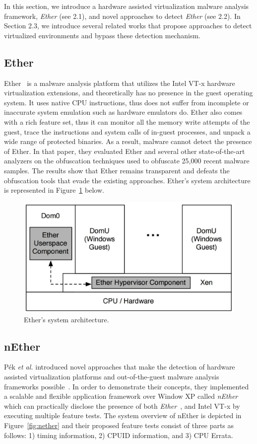 In this section, we introduce a hardware assisted virtualization malware analysis framework, \textit{Ether} (see 2.1), and novel approaches to detect \textit{Ether} (see 2.2). In Section 2.3, we introduce several related works that propose approaches to detect virtualized environments and bypass these detection mechanism.

\subsection{Ether}
Ether~\cite{ether} is a malware analysis platform that utilizes the Intel VT-x
hardware virtualization extensions, and theoretically has no presence in the
guest operating system. It uses native CPU instructions, thus does not suffer
from incomplete or inaccurate system emulation such as hardware emulators do.
Ether also comes with a rich feature set, thus it can monitor all the memory
write attempts of the guest, trace the instructions and system calls of in-guest
processes, and unpack a wide range of protected binaries. As a result, malware
cannot detect the presence of Ether. In that paper, they evaluated Ether and
several other state-of-the-art analyzers on the obfuscation techniques used to
obfuscate 25,000 recent malware samples. The results show that Ether remains
transparent and defeats the obfuscation tools that evade the existing
approaches. Ether's system architecture is represented in Figure~\ref{fig:ether}
below.

\begin{figure}[!h]
	\centering
	\includegraphics[width=\linewidth]{figure/ether.png}
	\caption{Ether's system architecture.}
	\label{fig:ether}
\end{figure}

\subsection{nEther}
P{\'e}k \textit{et al.} introduced novel approaches that make the detection of
hardware assisted virtualization platforms and out-of-the-guest malware analysis
frameworks possible~\cite{nether}. In order to demonstrate their concepts, they
implemented a scalable and flexible application framework over Window XP called
\textit{nEther} which can practically disclose the presence of both
\textit{Ether}~\cite{ether}, and Intel VT-x by executing multiple feature tests.
The system overview of nEther is depicted in Figure~\ref{fig:nether} and their
proposed feature tests consist of three parts as follows: 1) timing information,
2) CPUID information, and 3) CPU Errata.


